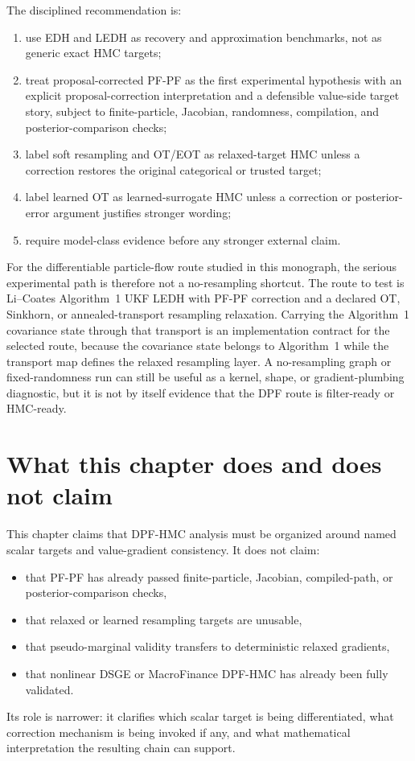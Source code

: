 The disciplined recommendation is:
\begin{enumerate}[label=(\roman*)]
  \item use EDH and LEDH as recovery and approximation benchmarks, not as
generic exact HMC targets;
  \item treat proposal-corrected PF-PF as the first experimental hypothesis with
    an explicit proposal-correction interpretation and a defensible value-side
    target story, subject to finite-particle, Jacobian, randomness,
    compilation, and posterior-comparison checks;
  \item label soft resampling and OT/EOT as relaxed-target HMC unless a
    correction restores the original categorical or trusted target;
  \item label learned OT as learned-surrogate HMC unless a correction or
    posterior-error argument justifies stronger wording;
  \item require model-class evidence before any stronger external claim.
\end{enumerate}

For the differentiable particle-flow route studied in this monograph, the
serious experimental path is therefore not a
no-resampling shortcut.  The route to test is Li--Coates Algorithm~1 UKF LEDH
with PF-PF correction and a declared OT, Sinkhorn, or annealed-transport
resampling relaxation.  Carrying the Algorithm~1 covariance state through that
transport is an implementation contract for the selected route, because the
covariance state belongs to Algorithm~1 while the transport map defines the
relaxed resampling layer.  A no-resampling graph or fixed-randomness run can
still be useful as a kernel, shape, or gradient-plumbing diagnostic, but it is
not by itself evidence that the DPF route is filter-ready or HMC-ready.

\section{What this chapter does and does not claim}
\label{sec:bf-dpf-hmc-boundary}

This chapter claims that DPF-HMC analysis must be organized around named scalar
targets and value-gradient consistency.  It does not claim:
\begin{itemize}
  \item that PF-PF has already passed finite-particle, Jacobian, compiled-path,
    or posterior-comparison checks,
  \item that relaxed or learned resampling targets are unusable,
  \item that pseudo-marginal validity transfers to deterministic relaxed
    gradients,
  \item that nonlinear DSGE or MacroFinance DPF-HMC has already been fully
    validated.
\end{itemize}
Its role is narrower: it clarifies which scalar target is being differentiated,
what correction mechanism is being invoked if any, and what mathematical
interpretation the resulting chain can support.

\FloatBarrier
